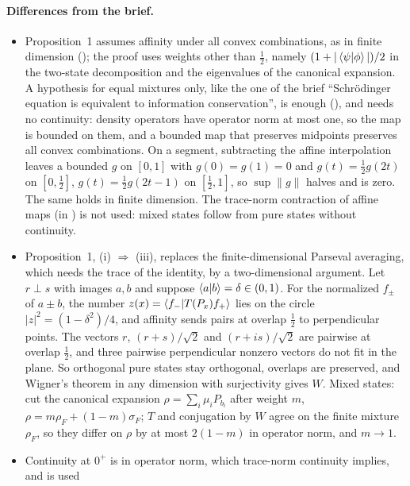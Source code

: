 \documentclass[11pt]{article}
\begin{document}
\paragraph{Differences from the brief.}
\begin{itemize}
\item Proposition~1 assumes affinity under all convex combinations, as in finite dimension
  (); the proof uses weights other than $\tfrac12$, namely
  $(1 + |\braket{\psi|\phi}|)/2$ in the two-state decomposition and the eigenvalues of the
  canonical expansion. A hypothesis for equal mixtures only, like the one of the brief
  ``Schr\"odinger equation is equivalent to information conservation'', is enough
  (), and needs no continuity: density
  operators have operator norm at most one, so the map is bounded on them, and a bounded map
  that preserves midpoints preserves all convex combinations. On a segment, subtracting the
  affine interpolation leaves a bounded $g$ on $[0,1]$ with $g(0) = g(1) = 0$ and
  $g(t) = \tfrac12 g(2t)$ on $[0,\tfrac12]$, $g(t) = \tfrac12 g(2t-1)$ on $[\tfrac12,1]$, so
  $\sup\|g\|$ halves and is zero. The same holds in finite dimension. The trace-norm
  contraction of affine maps (in ) is not used: mixed states follow from pure
  states without continuity.
\item Proposition~1, (i) $\Rightarrow$ (iii), replaces the finite-dimensional Parseval averaging,
  which needs the trace of the identity, by a two-dimensional argument. Let $r \perp s$ with
  images $a, b$ and suppose $\braket{a|b} = \delta \in (0,1)$. For the normalized $f_\pm$ of
  $a \pm b$, the number $z(x) = \braket{f_-|T(P_x) f_+}$ lies on the circle
  $|z|^2 = (1-\delta^2)/4$, and affinity sends pairs at overlap $\tfrac12$ to perpendicular
  points. The vectors $r$, $(r+s)/\sqrt2$ and $(r+is)/\sqrt2$ are pairwise at overlap $\tfrac12$,
  and three pairwise perpendicular nonzero vectors do not fit in the plane. So orthogonal pure
  states stay orthogonal, overlaps are preserved, and Wigner's theorem in any dimension with
  surjectivity gives $W$. Mixed states: cut the canonical expansion
  $\rho = \sum_i \mu_i P_{b_i}$ after weight $m$, $\rho = m\rho_F + (1-m)\sigma_F$; $T$ and
  conjugation by $W$ agree on the finite mixture $\rho_F$, so they differ on $\rho$ by at most
  $2(1-m)$ in operator norm, and $m \to 1$.
\item Continuity at $0^+$ is in operator norm, which trace-norm continuity implies, and is used

\end{itemize}
\end{document}
